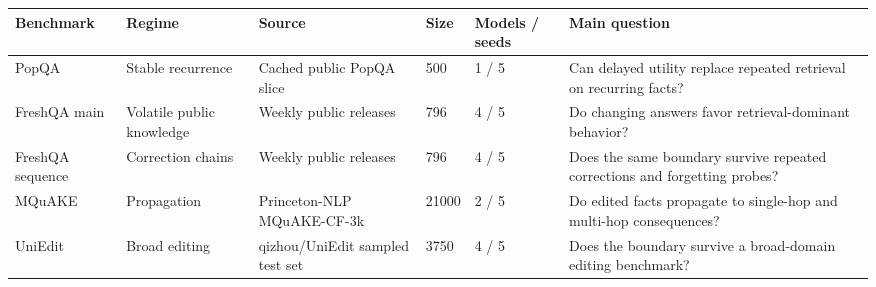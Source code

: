 \begin{tabular}{p{1.8cm}p{1.8cm}p{1.9cm}p{1.0cm}p{1.4cm}p{3.1cm}}
\toprule
Benchmark & Regime & Source & Size & Models / seeds & Main question \\
\midrule
PopQA & Stable recurrence & Cached public PopQA slice & 500 & 1 / 5 & Can delayed utility replace repeated retrieval on recurring facts? \\
FreshQA main & Volatile public knowledge & Weekly public releases & 796 & 4 / 5 & Do changing answers favor retrieval-dominant behavior? \\
FreshQA sequence & Correction chains & Weekly public releases & 796 & 4 / 5 & Does the same boundary survive repeated corrections and forgetting probes? \\
MQuAKE & Propagation & Princeton-NLP MQuAKE-CF-3k & 21000 & 2 / 5 & Do edited facts propagate to single-hop and multi-hop consequences? \\
UniEdit & Broad editing & qizhou/UniEdit sampled test set & 3750 & 4 / 5 & Does the boundary survive a broad-domain editing benchmark? \\
\bottomrule
\end{tabular}
